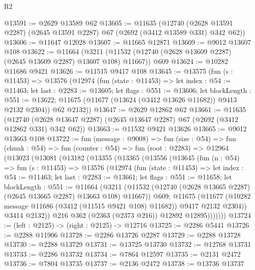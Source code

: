 \begin{lexlean}{R2}
\begin{coremodule}
@13591 := @2629 @13589 @62
@13605 := @11635
    (@12740 (@2628 @13591 @2287) (@2645 @13591 @2287) @67 (@2692 (@3412 @13589 @331) @342 @62))
@13606 := @11647 @12028
@13607 := @11665 @12871
@13609 := @9012 @13607 @108
@13622 := @11664
    (@3211 (@11532 (@12740 (@2628 @13609 @2287) (@2645 @13609 @2287) @13607 @108) @11667))
    @609
@13624 := @10282 @11686 @9421
@13626 := @11515 @9417 @108
@13645 := @13575
    (fun (s : @11453) =>
    @13576
      (@12974
        (fun (state : @11453) =>
        let index : @54 := @11463;
        let last : @2283 := @13605;
        let flags : @551 := @13606;
        let blockLength : @551 := @13622;
        @11675 (@11677 (@13624 (@3412 @13626 @11682)) @9413 @2132 @2304))
        @62
        @2132))
@13647 := @2629 @12862 @62
@13661 := @11635
    (@12740 (@2628 @13647 @2287) (@2645 @13647 @2287) @67 (@2692 (@3412 @12862 @331) @342 @62))
@13663 := @11532 @9421 @13626
@13665 := @9012 @13663 @108
@13722 := fun (message : @9008) =>
  fun (size : @54) =>
  fun (chunk : @54) =>
  fun (counter : @54) =>
  fun (root : @2283) =>
  @12964
    (@13023
      (@13081
        (@13182
          (@13355
            (@13365
              (@13556
                (@13645
                  (fun (n : @54) =>
                  fun (s : @11453) =>
                  @13576
                    (@12974
                      (fun (state : @11453) =>
                      let index : @54 := @11463;
                      let last : @2283 := @13661;
                      let flags : @551 := @11658;
                      let blockLength : @551 := @11664
                        (@3211
                          (@11532
                            (@12740 (@2628 @13665 @2287) (@2645 @13665 @2287) @13663 @108)
                            @11667))
                        @609;
                      @11675
                        (@11677
                          (@10282 message @11686 (@3412 (@11515 @9421 @108) @11682))
                          @9417
                          @2132
                          @2304))
                      @3414
                      @2132))
                  @216
                  @362
                  (@2363 (@2373 @216))
                  @12892
                  @12895)))))))
@13724 := (left : @2125) -> (right : @2125) -> @12716
@13725 := @2286 @5441
@13726 := @2288 @11906
@13728 := @2286 @13726 @2287
@13729 := @2288 @13728
@13730 := @2288 @13729
@13731 := @13725 @13730
@13732 := @12768 @13731
@13733 := @2286 @13732
@13734 := @7864 @12597
@13735 := @2131 @2472
@13736 := @7804 @13735
@13737 := @2136 @2472
@13738 := @13736 @13737

\end{coremodule}
\end{lexlean}

